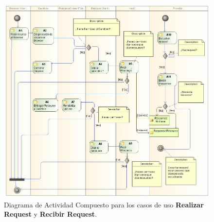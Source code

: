 \begin{figure}[h!t]
    \centering
    \includegraphics[scale=0.45]{figures/chap5/activityDiag.jpg}
    \caption{Diagrama de Actividad Compuesto para los casos de uso \textbf{Realizar Request} y \textbf{Recibir Request}.}
    \label{fig:ActDiagr}
\end{figure}

